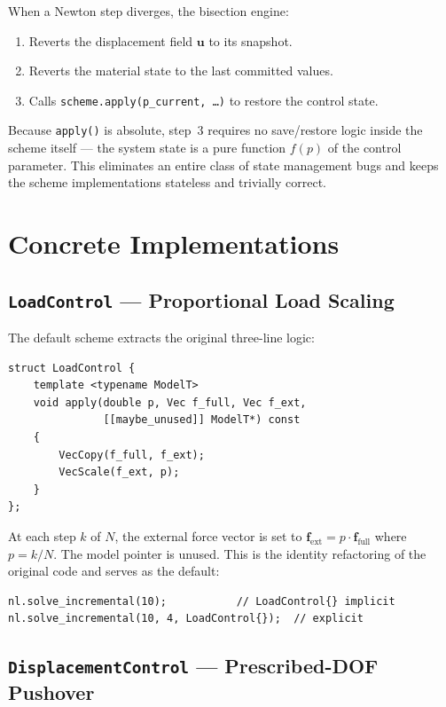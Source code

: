 When a Newton step diverges, the bisection engine:
\begin{enumerate}
  \item Reverts the displacement field $\mathbf{u}$ to its snapshot.
  \item Reverts the material state to the last committed values.
  \item Calls \texttt{scheme.apply(p\_current, \ldots)} to restore
        the control state.
\end{enumerate}

Because \texttt{apply()} is absolute, step~3 requires no save/restore
logic inside the scheme itself --- the system state is a pure function
$f(p)$ of the control parameter.  This eliminates an entire class of
state management bugs and keeps the scheme implementations stateless
and trivially correct.

\section{Concrete Implementations}
\label{sec:ic-implementations}

\subsection{\texttt{LoadControl} --- Proportional Load Scaling}
\label{ssec:ic-load}

The default scheme extracts the original three-line logic:

\begin{lstlisting}
struct LoadControl {
    template <typename ModelT>
    void apply(double p, Vec f_full, Vec f_ext,
               [[maybe_unused]] ModelT*) const
    {
        VecCopy(f_full, f_ext);
        VecScale(f_ext, p);
    }
};
\end{lstlisting}

At each step $k$ of $N$, the external force vector is set to
$\mathbf{f}_\text{ext} = p \cdot \mathbf{f}_\text{full}$ where
$p = k/N$.  The model pointer is unused.  This is the identity
refactoring of the original code and serves as the default:

\begin{lstlisting}
nl.solve_incremental(10);           // LoadControl{} implicit
nl.solve_incremental(10, 4, LoadControl{});  // explicit
\end{lstlisting}

\subsection{\texttt{DisplacementControl} --- Prescribed-DOF Pushover}
\label{ssec:ic-displacement}

